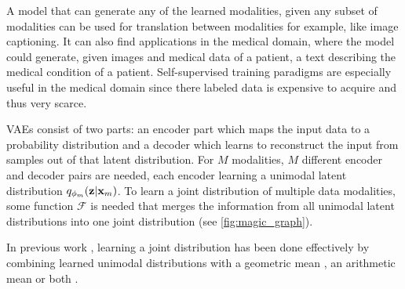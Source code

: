 
A model that can generate any of the learned modalities, given any subset of modalities can be used for translation between modalities for example, like image captioning.
It can also find applications in the medical domain, where the model could generate, given images and medical data of a patient, a text describing the medical condition of a patient.
Self-supervised training paradigms are especially useful in the medical domain since there labeled data is expensive to acquire and thus very scarce.


VAEs consist of two parts: an encoder part which maps the input data to a probability distribution and a decoder which learns to reconstruct the input from samples out of that latent distribution.
For $M$ modalities, $M$ different encoder and decoder pairs are needed, each encoder learning a unimodal latent distribution $q_{\phi_m}(\textbf{z}|\textbf{x}_m)$.
To learn a joint distribution of multiple data modalities, some function $\mathcal{F}$ is needed that merges the information from all unimodal latent distributions into one joint distribution (see \cref{fig:magic_graph}).


In previous work \parencite{poe,shi_variational_2019,sutter_generalized_2020}, learning a joint distribution has been done effectively by combining learned unimodal distributions with a geometric mean \parencite{poe}, an arithmetic mean \parencite{shi_variational_2019} or both \parencite{sutter_generalized_2020}.


